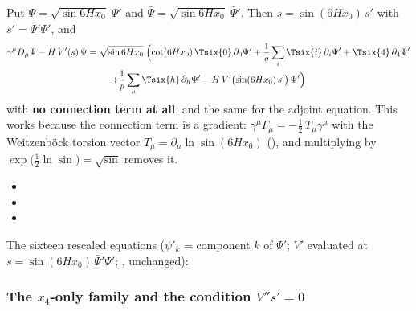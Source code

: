 Put $\Psi=\sqrt{\sin 6Hx_0}\;\Psi'$ and $\bar\Psi=\sqrt{\sin 6Hx_0}\;\bar\Psi'$. Then
$s=\sin(6Hx_0)\,s'$ with $s'=\bar\Psi'\Psi'$, and
\begin{multline*}
  \gamma^\mu D_\mu\Psi-H\,V'(s)\,\Psi=\sqrt{\sin 6Hx_0}\;\Bigl(\cot(6Hx_0)\,\Tsix{0}\,\partial_0\Psi'
  +\frac1q\sum_i\Tsix{i}\,\partial_i\Psi'+\Tsix{4}\,\partial_4\Psi'\\
  +\frac1p\sum_h\Tsix{h}\,\partial_h\Psi'-H\,V'\bigl(\sin(6Hx_0)\,s'\bigr)\,\Psi'\Bigr)
\end{multline*}
with \textbf{no connection term at all}, and the same for the adjoint equation. This works because
the connection term is a gradient: $\gamma^\mu\Gamma_\mu=-\tfrac12\,T_\mu\gamma^\mu$ with the
Weitzenb\"ock torsion vector $T_\mu=\partial_\mu\ln\sin(6Hx_0)$ (), and multiplying by
$\exp\bigl(\tfrac12\ln\sin\bigr)=\sqrt{\sin}$ removes it. 
\begin{itemize}
  \item {}
  \item {}
  \item {}
\end{itemize}

The sixteen rescaled equations ($\psi'_k$ = component $k$ of $\Psi'$; $V'$ evaluated at
$s=\sin(6Hx_0)\,\bar\Psi'\Psi'$;
, unchanged):

{\small

}

\subsubsection{The \texorpdfstring{$x_4$}{x4}-only family and the condition \texorpdfstring{$V''s'=0$}{V'' s' = 0}}
\label{sec:3.4.8}


